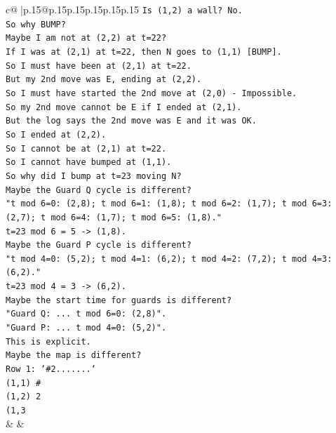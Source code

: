 \documentclass{article}
\begin{document}
{\begin{supertabular}{c@{$\;$}|p{.15\linewidth}@{}p{.15\linewidth}p{.15\linewidth}p{.15\linewidth}p{.15\linewidth}p{.15\linewidth}}
{{{\texttt{Is (1,2) a wall? No.} \\
\texttt{So why BUMP?} \\
\texttt{Maybe I am not at (2,2) at t=22?} \\
\texttt{If I was at (2,1) at t=22, then N goes to (1,1) {[}BUMP{]}.} \\
\texttt{So I must have been at (2,1) at t=22.} \\
\texttt{But my 2nd move was E, ending at (2,2).} \\
\texttt{So I must have started the 2nd move at (2,0) {-} Impossible.} \\
\texttt{So my 2nd move cannot be E if I ended at (2,1).} \\
\texttt{But the log says the 2nd move was E and it was OK.} \\
\texttt{So I ended at (2,2).} \\
\texttt{So I cannot be at (2,1) at t=22.} \\
\texttt{So I cannot have bumped at (1,1).} \\
\texttt{So why did I bump at t=23 moving N?} \\
\texttt{Maybe the Guard Q cycle is different?} \\
\texttt{"t mod 6=0: (2,8); t mod 6=1: (1,8); t mod 6=2: (1,7); t mod 6=3: (2,7); t mod 6=4: (1,7); t mod 6=5: (1,8)."} \\
\texttt{t=23 mod 6 = 5 {-}> (1,8).} \\
\texttt{Maybe the Guard P cycle is different?} \\
\texttt{"t mod 4=0: (5,2); t mod 4=1: (6,2); t mod 4=2: (7,2); t mod 4=3: (6,2)."} \\
\texttt{t=23 mod 4 = 3 {-}> (6,2).} \\
\texttt{Maybe the start time for guards is different?} \\
\texttt{"Guard Q: ... t mod 6=0: (2,8)".} \\
\texttt{"Guard P: ... t mod 4=0: (5,2)".} \\
\texttt{This is explicit.} \\
\texttt{Maybe the map is different?} \\
\texttt{Row 1: `\#2.......`} \\
\texttt{(1,1) \#} \\
\texttt{(1,2) 2} \\
\texttt{(1,3} \\
            }
        }
    }
    & & \\ \\


\end{supertabular}}
\end{document}
